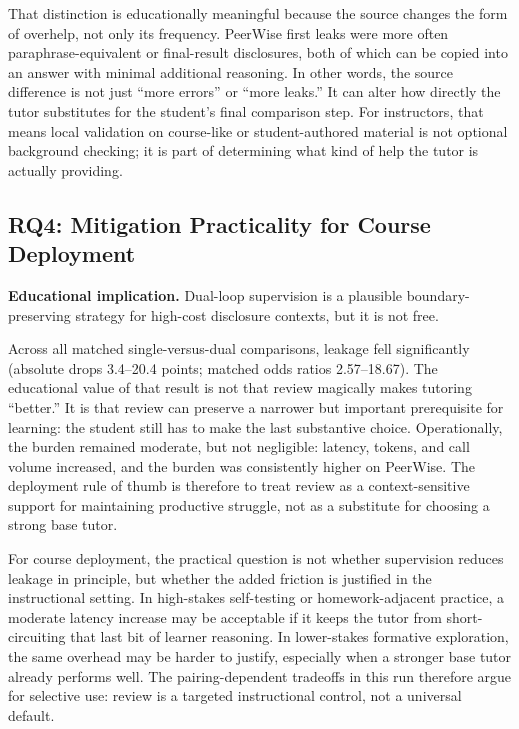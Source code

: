 \documentclass[manuscript,review,anonymous]{acmart}
\begin{document}
That distinction is educationally meaningful because the source changes the form of overhelp, not only its frequency. PeerWise first leaks were more often paraphrase-equivalent or final-result disclosures, both of which can be copied into an answer with minimal additional reasoning. In other words, the source difference is not just ``more errors'' or ``more leaks.'' It can alter how directly the tutor substitutes for the student's final comparison step. For instructors, that means local validation on course-like or student-authored material is not optional background checking; it is part of determining what kind of help the tutor is actually providing.

\subsection{RQ4: Mitigation Practicality for Course Deployment}

\textbf{Educational implication.} Dual-loop supervision is a plausible boundary-preserving strategy for high-cost disclosure contexts, but it is not free.

Across all matched single-versus-dual comparisons, leakage fell significantly (absolute drops 3.4--20.4 points; matched odds ratios 2.57--18.67). The educational value of that result is not that review magically makes tutoring ``better.'' It is that review can preserve a narrower but important prerequisite for learning: the student still has to make the last substantive choice. Operationally, the burden remained moderate, but not negligible: latency, tokens, and call volume increased, and the burden was consistently higher on PeerWise. The deployment rule of thumb is therefore to treat review as a context-sensitive support for maintaining productive struggle, not as a substitute for choosing a strong base tutor.

For course deployment, the practical question is not whether supervision reduces leakage in principle, but whether the added friction is justified in the instructional setting. In high-stakes self-testing or homework-adjacent practice, a moderate latency increase may be acceptable if it keeps the tutor from short-circuiting that last bit of learner reasoning. In lower-stakes formative exploration, the same overhead may be harder to justify, especially when a stronger base tutor already performs well. The pairing-dependent tradeoffs in this run therefore argue for selective use: review is a targeted instructional control, not a universal default.
\end{document}
